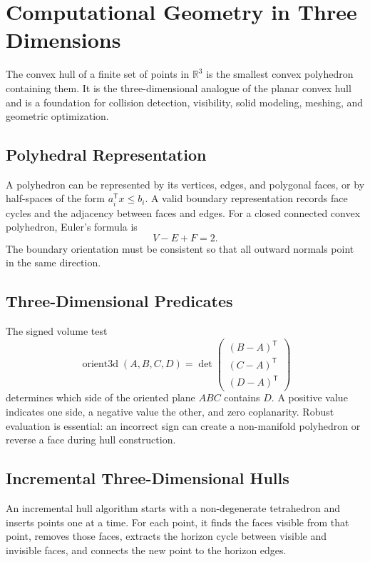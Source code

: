 \chapter{Computational Geometry in Three Dimensions}
\label{ch:polyhedral_geometry}

The convex hull of a finite set of points in $\mathbb{R}^3$ is the smallest convex
polyhedron containing them. It is the three-dimensional analogue of the
planar convex hull and is a foundation for collision detection, visibility,
solid modeling, meshing, and geometric optimization.

\section{Polyhedral Representation}
\label{sec:polyhedral_representation}

A polyhedron can be represented by its vertices, edges, and polygonal faces,
or by half-spaces of the form $a_i^{\mathsf T}x\leq b_i$. A valid boundary
representation records face cycles and the adjacency between faces and edges.
For a closed connected convex polyhedron, Euler's formula is
\[
  V-E+F=2.
\]
The boundary orientation must be consistent so that all outward normals point
in the same direction.

\section{Three-Dimensional Predicates}
\label{sec:three_dimensional_predicates}

The signed volume test
\[
\operatorname{orient3d}(A,B,C,D)=
\det\begin{pmatrix}(B-A)^{\mathsf T}\\(C-A)^{\mathsf T}\\(D-A)^{\mathsf T}\end{pmatrix}
\]
determines which side of the oriented plane $ABC$ contains $D$. A positive
value indicates one side, a negative value the other, and zero coplanarity.
Robust evaluation is essential: an incorrect sign can create a non-manifold
polyhedron or reverse a face during hull construction.

\section{Incremental Three-Dimensional Hulls}
\label{sec:incremental_3d_hull}

An incremental hull algorithm starts with a non-degenerate tetrahedron and
inserts points one at a time. For each point, it finds the faces visible from
that point, removes those faces, extracts the horizon cycle between visible
and invisible faces, and connects the new point to the horizon edges.

